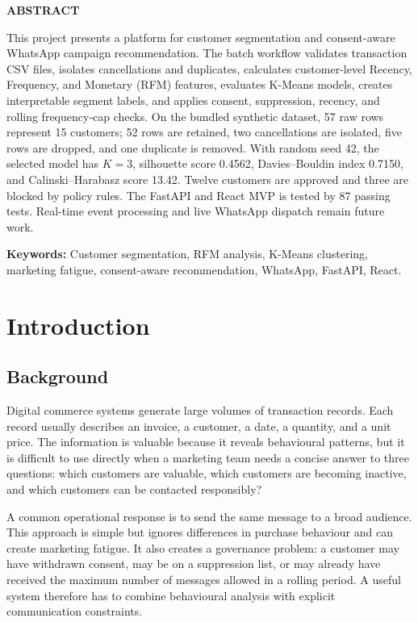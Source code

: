 \documentclass[12pt,a4paper]{report}
\begin{document}
\newpage
\thispagestyle{plain}
\begin{center}\textbf{\fontsize{12}{14}\selectfont ABSTRACT}\end{center}
This project presents a platform for customer segmentation and consent-aware WhatsApp campaign recommendation. The batch workflow validates transaction CSV files, isolates cancellations and duplicates, calculates customer-level Recency, Frequency, and Monetary (RFM) features, evaluates K-Means models, creates interpretable segment labels, and applies consent, suppression, recency, and rolling frequency-cap checks. On the bundled synthetic dataset, 57 raw rows represent 15 customers; 52 rows are retained, two cancellations are isolated, five rows are dropped, and one duplicate is removed. With random seed 42, the selected model has $K=3$, silhouette score 0.4562, Davies--Bouldin index 0.7150, and Calinski--Harabasz score 13.42. Twelve customers are approved and three are blocked by policy rules. The FastAPI and React MVP is tested by 87 passing tests. Real-time event processing and live WhatsApp dispatch remain future work.

\vspace{0.12in}
\noindent\textbf{Keywords:} Customer segmentation, RFM analysis, K-Means clustering, marketing fatigue, consent-aware recommendation, WhatsApp, FastAPI, React.

\clearpage{}
\chapter{Introduction}
\section{Background}
Digital commerce systems generate large volumes of transaction records. Each record usually describes an invoice, a customer, a date, a quantity, and a unit price. The information is valuable because it reveals behavioural patterns, but it is difficult to use directly when a marketing team needs a concise answer to three questions: which customers are valuable, which customers are becoming inactive, and which customers can be contacted responsibly?

A common operational response is to send the same message to a broad audience. This approach is simple but ignores differences in purchase behaviour and can create marketing fatigue. It also creates a governance problem: a customer may have withdrawn consent, may be on a suppression list, or may already have received the maximum number of messages allowed in a rolling period. A useful system therefore has to combine behavioural analysis with explicit communication constraints.
\end{document}
